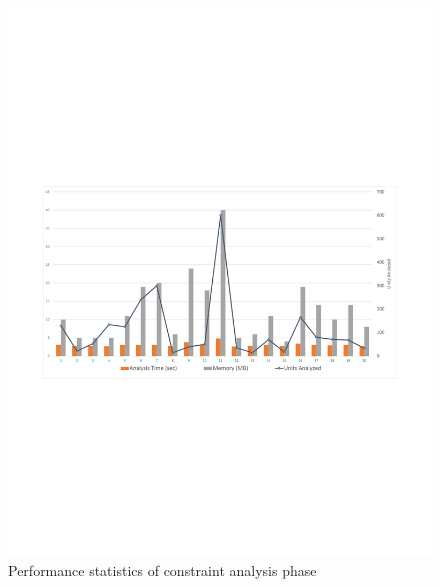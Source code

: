 \begin{figure}[t]
\centering
\includegraphics[scale = .5]{images/ConstraintHisto.pdf}
\caption{Performance statistics of constraint analysis phase}
\label{fig:constraintHisto}
\end{figure}



